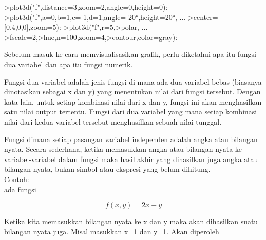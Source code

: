 \documentclass[a4paper,10pt]{article}
\begin{document}
\begin{eulernotebook}
\begin{eulercomment}
\begin{eulercomment}
\begin{eulercomment}
\begin{eulercomment}
\begin{eulercomment}
\begin{eulercomment}
\begin{eulercomment}
\begin{eulercomment}
\begin{eulercomment}
\begin{eulercomment}
\begin{eulercomment}
\begin{eulercomment}
\begin{euleroutput}
  [5,  2.6,  2,  0.4]
\end{euleroutput}
\begin{eulerprompt}
>plot3d("f",distance=3,zoom=2,angle=0,height=0):
>plot3d("f",a=0,b=1,c=-1,d=1,angle=-20°,height=20°, ...
>center=[0.4,0,0],zoom=5):
>plot3d("f",r=5,>polar, ...
>fscale=2,>hue,n=100,zoom=4,>contour,color=gray):
\end{eulerprompt}
\begin{eulercomment}
Sebelum masuk ke cara memvisualisasikan grafik, perlu diketahui apa
itu fungsi dua variabel dan apa itu fungsi numerik.

\end{eulercomment}
\begin{eulercomment}
Fungsi dua variabel adalah jenis fungsi di mana ada dua variabel bebas
(biasanya dinotasikan sebagai x dan y) yang menentukan nilai dari
fungsi tersebut. Dengan kata lain, untuk setiap kombinasi nilai dari x
dan y, fungsi ini akan menghasilkan satu nilai output tertentu. Fungsi
dari dua variabel yang mana setiap kombinasi nilai dari kedua variabel
tersebut menghasilkan sebuah nilai tunggal.


\end{eulercomment}
\begin{eulercomment}
Fungsi dimana setiap pasangan variabel independen adalah angka atau
bilangan nyata. Secara sederhana, ketika memasukkan angka atau
bilangan nyata ke variabel-variabel dalam fungsi maka hasil akhir yang
dihasilkan juga angka atau bilangan nyata, bukan simbol atau ekspresi
yang belum dihitung.\\
Contoh:\\
ada fungsi\\
\end{eulercomment}
\begin{eulerformula}
\[
f(x,y)=2x+y
\]
\end{eulerformula}
\begin{eulercomment}
Ketika kita memasukkan bilangan nyata ke x dan y maka akan dihasilkan
suatu bilangan nyata juga. Misal masukkan x=1 dan y=1. Akan diperoleh


\end{eulercomment}
\end{eulercomment}
\end{eulercomment}
\end{eulercomment}
\end{eulercomment}
\end{eulercomment}
\end{eulercomment}
\end{eulercomment}
\end{eulercomment}
\end{eulercomment}
\end{eulercomment}
\end{eulercomment}
\end{eulercomment}
\end{eulernotebook}
\end{document}
